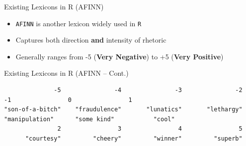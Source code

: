 \documentclass[
  ignorenonframetext,
  aspectratio=169]{beamer}
\newenvironment{Shaded}{\begin{snugshade}}{\end{snugshade}}
\newcommand{\AttributeTok}[1]{\textcolor[rgb]{0.13,0.29,0.53}{#1}}
\newcommand{\CommentTok}[1]{\textcolor[rgb]{0.56,0.35,0.01}{\textit{#1}}}
\newcommand{\DecValTok}[1]{\textcolor[rgb]{0.00,0.00,0.81}{#1}}
\newcommand{\FunctionTok}[1]{\textcolor[rgb]{0.13,0.29,0.53}{\textbf{#1}}}
\newcommand{\NormalTok}[1]{#1}
\newcommand{\OtherTok}[1]{\textcolor[rgb]{0.56,0.35,0.01}{#1}}
\newcommand{\SpecialCharTok}[1]{\textcolor[rgb]{0.81,0.36,0.00}{\textbf{#1}}}
\newcommand{\StringTok}[1]{\textcolor[rgb]{0.31,0.60,0.02}{#1}}
\begin{document}
\begin{frame}{Existing Lexicons in R (AFINN)}
\label{existing-lexicons-in-r-afinn}
\begin{itemize}
\item \texttt{AFINN} is another lexicon widely used in \texttt{R}
\item Captures both direction \textbf{and} intensity of rhetoric
\item Generally ranges from -5 (\textbf{Very Negative}) to +5 (\textbf{Very Positive})
\end{itemize}
\end{frame}

\begin{frame}[fragile]{Existing Lexicons in R (AFINN -- Cont.)}
\label{existing-lexicons-in-r-afinn-cont.}
\scriptsize

\begin{Shaded}
\end{Shaded}

\begin{verbatim}
              -5               -4               -3               -2               -1                0                1 
"son-of-a-bitch"    "fraudulence"       "lunatics"       "lethargy"   "manipulation"      "some kind"           "cool" 
               2                3                4                5 
      "courtesy"         "cheery"         "winner"         "superb" 
\end{verbatim}
\end{frame}
\end{document}
